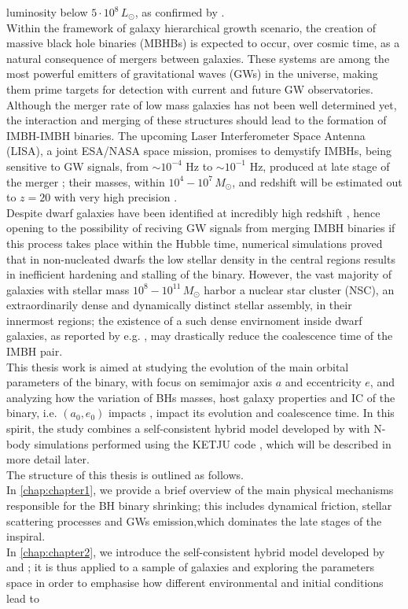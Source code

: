 \documentclass[12pt,twoside,openany]{book}
\begin{document}
luminosity below $5 \cdot 10^8\, L_\odot$, as confirmed by \textcite{Reines_2013}.\\Within the framework of galaxy hierarchical growth scenario, the creation of massive black hole binaries (MBHBs) is expected to occur, over cosmic time, as a natural consequence of mergers between galaxies. These systems are among the most powerful emitters of gravitational waves (GWs) in the universe, making them prime targets for detection with current and future GW observatories.\\Although the merger rate of low mass galaxies has not been well determined yet, the interaction and merging of these structures should lead to the formation of IMBH-IMBH binaries. The upcoming Laser Interferometer Space Antenna (LISA), a joint ESA/NASA space mission, promises to demystify IMBHs, being sensitive to GW signals, from $\sim 10^{-4}$ Hz to $\sim 10^{-1}$ Hz, produced at late stage of the merger \parencite{Amaro-Seoane_2017}; their masses, within $10^4-10^7\,M_\odot$, and redshift will be estimated out to $z=20$ with very high precision \parencite{Colpi_2024}.\\Despite dwarf galaxies have been identified at incredibly high redshift \parencite{Kikuchihara_2020}, hence opening to the possibility of reciving GW signals from merging IMBH binaries if this process takes place within the Hubble time, numerical simulations \parencite{Khan_2024} proved that in non-nucleated dwarfs the low stellar density in the central regions results in inefficient hardening and stalling of the binary. However, the vast majority of galaxies with stellar mass $10^8-10^{11}\,M_\odot$ harbor a nuclear star cluster (NSC), an extraordinarily dense and dynamically distinct stellar assembly, in their innermost regions; the existence of a such dense envirnoment inside dwarf galaxies, as reported by e.g. \textcite{Nguyen_2018}, may drastically reduce the coalescence time of the IMBH pair.\\This thesis work is aimed at studying the evolution of the main orbital parameters of the binary, with focus on semimajor axis $a$ and eccentricity $e$, and analyzing how the variation of BHs masses, host galaxy properties and IC of the binary, i.e. $(a_0,e_0)$ impacts , impact its evolution and coalescence time. In this spirit, the study combines a self-consistent hybrid model developed by \textcite{Sesana_2010} with N-body simulations performed using the KETJU code \parencite{Mannerkoski_2023}, which will be described in more detail later.\\The structure of this thesis is outlined as follows.\\In \autoref{chap:chapter1}, we provide a brief overview of the main physical mechanisms responsible for the BH binary shrinking; this includes dynamical friction, stellar scattering processes and GWs emission,which dominates the late stages of the inspiral.\\In \autoref{chap:chapter2}, we introduce the self-consistent hybrid model developed by \textcite{Quinlan_1996} and \textcite{Sesana_2010}; it is thus applied to a sample of galaxies and exploring the parameters space in order to emphasise how different environmental and initial conditions lead to 
\end{document}
